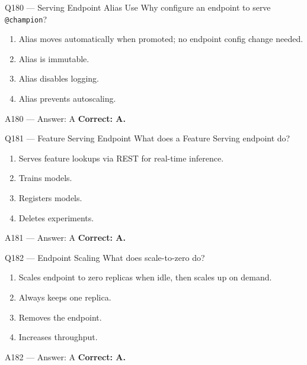 \documentclass[aspectratio=169,9pt]{beamer}
\begin{document}
	\begin{frame}{Q180 --- Serving Endpoint Alias Use}
		Why configure an endpoint to serve \texttt{@champion}?
		\begin{enumerate}[label=\Alph*.]
			\item Alias moves automatically when promoted; no endpoint config change needed.
			\item Alias is immutable.
			\item Alias disables logging.
			\item Alias prevents autoscaling.
		\end{enumerate}
	\end{frame}
	
	\begin{frame}{A180 --- Answer: A}
		\textbf{Correct: A.}
	\end{frame}
	
	\begin{frame}{Q181 --- Feature Serving Endpoint}
		What does a Feature Serving endpoint do?
		\begin{enumerate}[label=\Alph*.]
			\item Serves feature lookups via REST for real-time inference.
			\item Trains models.
			\item Registers models.
			\item Deletes experiments.
		\end{enumerate}
	\end{frame}
	
	\begin{frame}{A181 --- Answer: A}
		\textbf{Correct: A.}
	\end{frame}
	
	\begin{frame}{Q182 --- Endpoint Scaling}
		What does scale-to-zero do?
		\begin{enumerate}[label=\Alph*.]
			\item Scales endpoint to zero replicas when idle, then scales up on demand.
			\item Always keeps one replica.
			\item Removes the endpoint.
			\item Increases throughput.
		\end{enumerate}
	\end{frame}
	
	\begin{frame}{A182 --- Answer: A}
		\textbf{Correct: A.}
	\end{frame}
	
\end{document}
